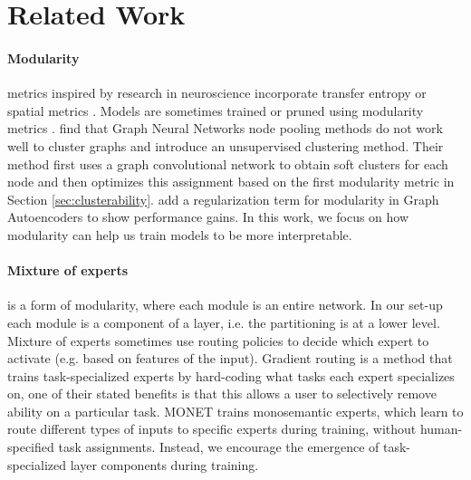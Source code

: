 \section{Related Work}
\label{sec:related}

\paragraph{Modularity} metrics inspired by research in neuroscience incorporate transfer entropy \citep{novelli2019deriving, ursino2020transfer} %
or spatial metrics \citep{liu2023seeing, liu2023growing}. %
Models are sometimes trained or pruned using modularity metrics \citep{patil2023neural}.
\citet{tsitsulin2023graph} find that Graph Neural Networks node pooling methods do not work well to cluster graphs and introduce an unsupervised clustering method.
Their method first uses a graph convolutional network to obtain soft clusters for each node and then 
optimizes this assignment based on the first modularity metric in Section \ref{sec:clusterability}.
\citet{salha2022modularity} add a regularization term for modularity in Graph Autoencoders to show performance gains. In this work, we focus on how modularity can help us train models to be more interpretable.


\paragraph{Mixture of experts} is a form of modularity, where each module is an entire network. In our set-up each module is a component of a layer, i.e. the partitioning is at a lower level. Mixture of experts sometimes use routing policies to decide which expert to activate (e.g. based on features of the input).
Gradient routing \citep{cloud2024gradient} is a method that trains task-specialized experts by hard-coding what tasks each expert specializes on, one of their stated benefits is that this allows a user to selectively remove ability on a particular task. 
MONET \citep{park2024monet} trains monosemantic experts, which learn to route different types of inputs to specific experts during training, without human-specified task assignments.
Instead, we encourage the emergence of task-specialized layer components during training.

